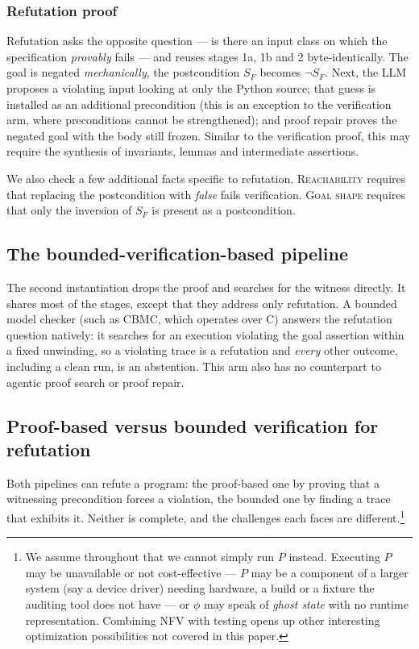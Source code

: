 \documentclass[11pt,letterpaper]{article}
\newcommand{\sys}{NFV}
\begin{document}
\subsubsection{Refutation proof}
\label{sec:refutation}

Refutation asks the opposite question --- is there an input class on which the
specification \emph{provably} fails --- and reuses stages 1a, 1b and 2
byte-identically. The goal is negated
\emph{mechanically}, the postcondition $S_F$ becomes $\neg S_F$.
Next, the LLM proposes a violating input looking at only the
Python source; that guess is installed as an additional precondition (this is an exception 
to the verification arm, where preconditions cannot be strengthened); 
and proof repair proves the negated goal with the body still frozen. 
Similar to the verification proof, this may require the synthesis of invariants, lemmas 
and intermediate assertions. 

We also check a few additional facts specific to refutation.
\textsc{Reachability} requires that replacing the postcondition with 
\emph{false} fails verification. \textsc{Goal shape} requires that only the inversion of 
$S_F$ is present as a postcondition. 

\subsection{The bounded-verification-based pipeline}
\label{sec:cbmcarm}

The second instantiation drops the proof and searches for the witness directly.
It shares most of the stages, except that they address only refutation. 
A bounded model checker (such as \textsc{CBMC}, which operates over C) 
answers the refutation question
natively: it searches for an execution violating the goal assertion within a
fixed unwinding, so a violating trace is a refutation and \emph{every} other
outcome, including a clean run, is an abstention. This arm also has no
counterpart to agentic proof search or proof repair.

\subsection{Proof-based versus bounded verification for refutation}
\label{sec:incomplete}

Both pipelines can refute a program: the proof-based one by proving that a
witnessing precondition forces a violation, the bounded one by finding a trace
that exhibits it. Neither is complete, and the challenges each faces are
different.\footnote{We assume throughout that we cannot simply run $P$ instead.
Executing $P$ may be unavailable or not cost-effective --- $P$ may be a
component of a larger system (say a device driver) needing hardware, a build or
a fixture the auditing tool does not have --- or $\phi$ may speak of
\emph{ghost state} with no runtime representation. Combining \sys{} with testing
opens up other interesting optimization possibilities not covered in this paper.}
\end{document}
